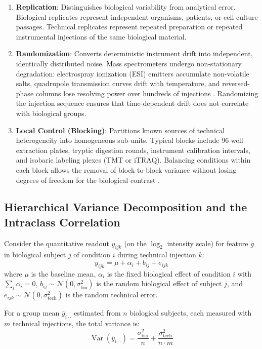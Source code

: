 \documentclass[11pt,twoside,openright]{book}
\begin{document}
\begin{enumerate}
    \item \textbf{Replication}: Distinguishes biological variability from analytical error. Biological replicates represent independent organisms, patients, or cell culture passages. Technical replicates represent repeated preparation or repeated instrumental injections of the same biological material.
    \item \textbf{Randomization}: Converts deterministic instrument drift into independent, identically distributed noise. Mass spectrometers undergo non-stationary degradation: electrospray ionization (ESI) emitters accumulate non-volatile salts, quadrupole transmission curves drift with temperature, and reversed-phase columns lose resolving power over hundreds of injections \cite{broadhurst2018guidelines, graw2020statistical}. Randomizing the injection sequence ensures that time-dependent drift does not correlate with biological groups.
    \item \textbf{Local Control (Blocking)}: Partitions known sources of technical heterogeneity into homogeneous sub-units. Typical blocks include 96-well extraction plates, tryptic digestion rounds, instrument calibration intervals, and isobaric labeling plexes (TMT or iTRAQ). Balancing conditions within each block allows the removal of block-to-block variance without losing degrees of freedom for the biological contrast \cite{box1978statistics}.
\end{enumerate}

\subsection{Hierarchical Variance Decomposition and the Intraclass Correlation}

Consider the quantitative readout $y_{ijk}$ (on the $\log_2$ intensity scale) for feature $g$ in biological subject $j$ of condition $i$ during technical injection $k$:
\begin{equation}
y_{ijk} = \mu + \alpha_i + b_{ij} + e_{ijk}
\label{eq:hierarchical_model}
\end{equation}
where $\mu$ is the baseline mean, $\alpha_i$ is the fixed biological effect of condition $i$ with $\sum_i \alpha_i = 0$, $b_{ij} \sim \mathcal{N}(0, \sigma^2_{\text{bio}})$ is the random biological effect of subject $j$, and $e_{ijk} \sim \mathcal{N}(0, \sigma^2_{\text{tech}})$ is the random technical error.

For a group mean $\bar{y}_{i\cdot\cdot}$ estimated from $n$ biological subjects, each measured with $m$ technical injections, the total variance is:
\begin{equation}
\operatorname{Var}(\bar{y}_{i\cdot\cdot}) = \frac{\sigma^2_{\text{bio}}}{n} + \frac{\sigma^2_{\text{tech}}}{n \cdot m}
\label{eq:var_mean}
\end{equation}
\end{document}
